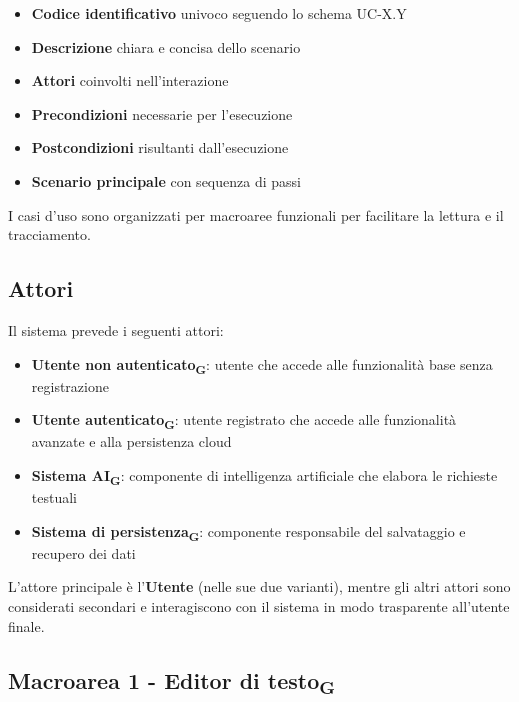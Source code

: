 \documentclass[11pt,a4paper]{article}
\newcommand{\gls}[1]{#1\textsubscript{G}}
\begin{document}
\begin{itemize}
    \item \textbf{Codice identificativo} univoco seguendo lo schema UC-X.Y
    \item \textbf{Descrizione} chiara e concisa dello scenario
    \item \textbf{Attori} coinvolti nell'interazione
    \item \textbf{Precondizioni} necessarie per l'esecuzione
    \item \textbf{Postcondizioni} risultanti dall'esecuzione
    \item \textbf{Scenario principale} con sequenza di passi
\end{itemize}

I casi d'uso sono organizzati per macroaree funzionali per facilitare la lettura e il tracciamento.

\subsection{Attori}
Il sistema prevede i seguenti attori:

\begin{itemize}
    \item \textbf{\gls{Utente non autenticato}}: utente che accede alle funzionalità base senza registrazione
    \item \textbf{\gls{Utente autenticato}}: utente registrato che accede alle funzionalità avanzate e alla persistenza cloud
    \item \textbf{\gls{Sistema AI}}: componente di intelligenza artificiale che elabora le richieste testuali
    \item \textbf{\gls{Sistema di persistenza}}: componente responsabile del salvataggio e recupero dei dati
\end{itemize}

L'attore principale è l'\textbf{Utente} (nelle sue due varianti), mentre gli altri attori sono considerati secondari e interagiscono con il sistema in modo trasparente all'utente finale.

\newpage

\subsection{Macroarea 1 - \gls{Editor di testo}}
\end{document}

